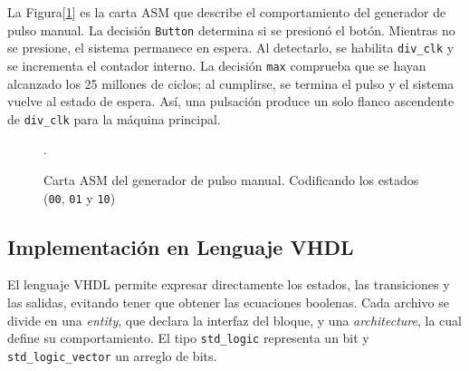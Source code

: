 \documentclass[letterpaper,12pt]{article}
\begin{document}
La Figura[\ref{fig:carta-asm}] es la carta ASM que describe el comportamiento del generador de pulso manual. La decisión \texttt{Button} determina si se presionó el botón. Mientras no se presione, el sistema permanece en espera. Al detectarlo, se habilita \texttt{div\_clk} y se incrementa el contador interno. La decisión \texttt{max} comprueba que se hayan alcanzado los 25 millones de ciclos; al cumplirse, se termina el pulso y el sistema vuelve al estado de espera. Así, una pulsación produce un solo flanco ascendente de \texttt{div\_clk} para la máquina principal.

\begin{figure}[H]
  \centering
  \caption{Carta ASM del generador de pulso manual. Codificando los estados (\texttt{00}, \texttt{01} y \texttt{10})}.
  \label{fig:carta-asm}
\end{figure}

\subsection{Implementación en Lenguaje VHDL}

El lenguaje VHDL permite expresar directamente los estados, las transiciones y las salidas, evitando tener que obtener las ecuaciones boolenas. Cada archivo se divide en una \textit{entity}, que declara la interfaz del bloque, y una \textit{architecture}, la cual define su comportamiento. El tipo \texttt{std\_logic} representa un bit y \texttt{std\_logic\_vector} un arreglo de bits.
\end{document}
